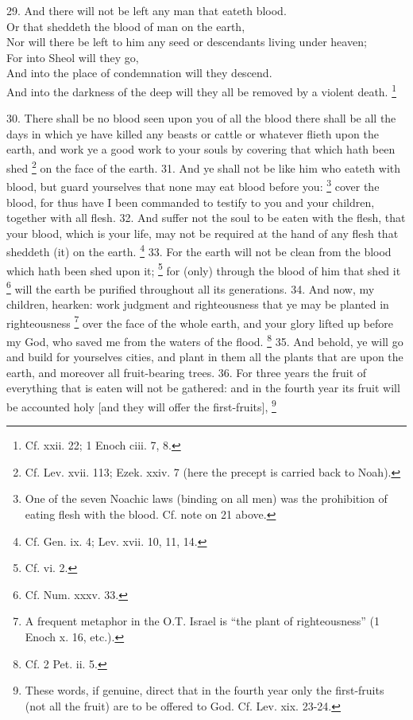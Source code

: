 29. And there will not be left any man that eateth blood.\\
Or that sheddeth the blood of man on the earth,\\
Nor will there be left to him any seed or descendants living under heaven;\\
For into Sheol will they go,\\
And into the place of condemnation will they descend. \\
And into the darkness of the deep will they all be removed by a violent death. \footnote{Cf. xxii. 22; 1 Enoch ciii. 7, 8.}

30. There shall be no blood seen upon you of all the blood there shall be all the days in which ye have killed any beasts or cattle or whatever flieth upon the earth, and work ye a good work to your souls by covering that which hath been shed \footnote{Cf. Lev. xvii. 113; Ezek. xxiv. 7 (here the precept is carried back to Noah).} on the face of the earth. 31. And ye shall not be like him who eateth with blood, but guard yourselves that none may eat blood before you: \footnote{One of the seven Noachic laws (binding on all men) was the prohibition of eating flesh with the blood. Cf. note on 21 above.} cover the blood, for thus have I been commanded to testify to you and your children, together with all flesh. 32. And suffer not the soul to be eaten with the flesh, that your blood, which is your life, may not be required at the hand of any flesh that sheddeth (it) on the earth. \footnote{Cf. Gen. ix. 4; Lev. xvii. 10, 11, 14.} 33. For the earth will not be clean from the blood which hath been shed upon it; \footnote{Cf. vi. 2.} for (only) through the blood of him that shed it \footnote{Cf. Num. xxxv. 33.} will the earth be purified throughout all its generations. 34. And now, my children, hearken: work judgment and righteousness that ye may be planted in righteousness \footnote{A frequent metaphor in the O.T. Israel is ``the plant of righteousness'' (1 Enoch x. 16, etc.).} over the face of the whole earth, and your glory lifted up before my God, who saved me from the waters of the flood. \footnote{Cf. 2 Pet. ii. 5.} 35. And behold, ye will go and build for yourselves cities, and plant in them all the plants that are upon the earth, and moreover all fruit-bearing trees. 36. For three years the fruit of everything that is eaten will not be gathered: and in the fourth year its fruit will be accounted holy [and they will offer the first-fruits], \footnote{These words, if genuine, direct that in the fourth year only the first-fruits (not all the fruit) are to be offered to God. Cf. Lev. xix. 23-24.}


